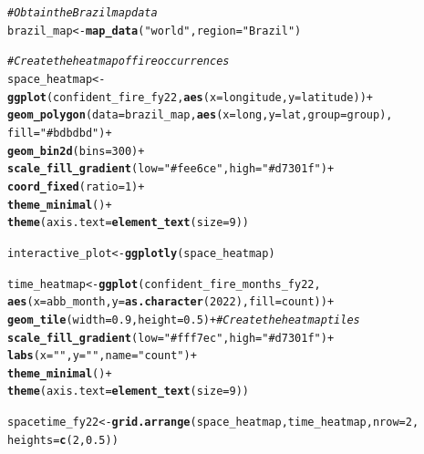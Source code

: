 \documentclass{article}\usepackage[]{graphicx}\usepackage[]{xcolor}
\makeatletter
\newcommand{\hlnum}[1]{\textcolor[rgb]{0.686,0.059,0.569}{#1}}%
\newcommand{\hlstr}[1]{\textcolor[rgb]{0.192,0.494,0.8}{#1}}%
\newcommand{\hlcom}[1]{\textcolor[rgb]{0.678,0.584,0.686}{\textit{#1}}}%
\newcommand{\hlopt}[1]{\textcolor[rgb]{0,0,0}{#1}}%
\newcommand{\hlstd}[1]{\textcolor[rgb]{0.345,0.345,0.345}{#1}}%
\newcommand{\hlkwb}[1]{\textcolor[rgb]{0.69,0.353,0.396}{#1}}%
\newcommand{\hlkwc}[1]{\textcolor[rgb]{0.333,0.667,0.333}{#1}}%
\newcommand{\hlkwd}[1]{\textcolor[rgb]{0.737,0.353,0.396}{\textbf{#1}}}%
\newenvironment{kframe}{%
 \def\at@end@of@kframe{}%
 \ifinner\ifhmode%
  \def\at@end@of@kframe{\end{minipage}}%
  \begin{minipage}{\columnwidth}%
 \fi\fi%
 \def\FrameCommand##1{\hskip\@totalleftmargin \hskip-\fboxsep
 \colorbox{shadecolor}{##1}\hskip-\fboxsep
     \hskip-\linewidth \hskip-\@totalleftmargin \hskip\columnwidth}%
 \MakeFramed {\advance\hsize-\width
   \@totalleftmargin\z@ \linewidth\hsize
   \@setminipage}}%
 {\par\unskip\endMakeFramed%
 \at@end@of@kframe}
\newenvironment{knitrout}{}{} %
\makeatother
\begin{document}
\begin{knitrout}\scriptsize
{}\color{fgcolor}\begin{kframe}
\begin{alltt}
\hlcom{# Obtain the Brazil map data}
\hlstd{brazil_map} \hlkwb{<-} \hlkwd{map_data}\hlstd{(}\hlstr{"world"}\hlstd{,} \hlkwc{region} \hlstd{=} \hlstr{"Brazil"}\hlstd{)}

\hlcom{# Create the heatmap of fire occurrences}
\hlstd{space_heatmap} \hlkwb{<-} \hlkwd{ggplot}\hlstd{(confident_fire_fy22,} \hlkwd{aes}\hlstd{(}\hlkwc{x} \hlstd{= longitude,} \hlkwc{y} \hlstd{= latitude))} \hlopt{+}
  \hlkwd{geom_polygon}\hlstd{(}\hlkwc{data} \hlstd{= brazil_map,} \hlkwd{aes}\hlstd{(}\hlkwc{x} \hlstd{= long,} \hlkwc{y} \hlstd{= lat,} \hlkwc{group} \hlstd{= group),}
               \hlkwc{fill} \hlstd{=} \hlstr{"#bdbdbd"}\hlstd{)} \hlopt{+}
  \hlkwd{geom_bin2d}\hlstd{(}\hlkwc{bins} \hlstd{=} \hlnum{300}\hlstd{)} \hlopt{+}
  \hlkwd{scale_fill_gradient}\hlstd{(}\hlkwc{low} \hlstd{=} \hlstr{"#fee6ce"}\hlstd{,} \hlkwc{high} \hlstd{=} \hlstr{"#d7301f"}\hlstd{)} \hlopt{+}
  \hlkwd{coord_fixed}\hlstd{(}\hlkwc{ratio} \hlstd{=} \hlnum{1}\hlstd{)} \hlopt{+}
  \hlkwd{theme_minimal}\hlstd{()}\hlopt{+}
  \hlkwd{theme}\hlstd{(}\hlkwc{axis.text} \hlstd{=} \hlkwd{element_text}\hlstd{(}\hlkwc{size} \hlstd{=} \hlnum{9}\hlstd{))}

\hlstd{interactive_plot} \hlkwb{<-} \hlkwd{ggplotly}\hlstd{(space_heatmap)}

\hlstd{time_heatmap} \hlkwb{<-} \hlkwd{ggplot}\hlstd{(confident_fire_months_fy22,}
                       \hlkwd{aes}\hlstd{(}\hlkwc{x} \hlstd{= abb_month,} \hlkwc{y} \hlstd{=} \hlkwd{as.character}\hlstd{(}\hlnum{2022}\hlstd{),} \hlkwc{fill} \hlstd{= count))} \hlopt{+}
  \hlkwd{geom_tile}\hlstd{(}\hlkwc{width} \hlstd{=} \hlnum{0.9}\hlstd{,} \hlkwc{height} \hlstd{=} \hlnum{0.5}\hlstd{)} \hlopt{+}  \hlcom{# Create the heatmap tiles}
  \hlkwd{scale_fill_gradient}\hlstd{(}\hlkwc{low} \hlstd{=} \hlstr{"#fff7ec"}\hlstd{,} \hlkwc{high} \hlstd{=} \hlstr{"#d7301f"}\hlstd{)} \hlopt{+}
  \hlkwd{labs}\hlstd{(}\hlkwc{x} \hlstd{=} \hlstr{" "}\hlstd{,} \hlkwc{y} \hlstd{=} \hlstr{" "}\hlstd{,} \hlkwc{name} \hlstd{=} \hlstr{"count"}\hlstd{)} \hlopt{+}
  \hlkwd{theme_minimal}\hlstd{()} \hlopt{+}
  \hlkwd{theme}\hlstd{(}\hlkwc{axis.text} \hlstd{=} \hlkwd{element_text}\hlstd{(}\hlkwc{size} \hlstd{=} \hlnum{9}\hlstd{))}

\hlstd{spacetime_fy22} \hlkwb{<-} \hlkwd{grid.arrange}\hlstd{(space_heatmap, time_heatmap,} \hlkwc{nrow} \hlstd{=} \hlnum{2}\hlstd{,}
                               \hlkwc{heights} \hlstd{=} \hlkwd{c}\hlstd{(}\hlnum{2}\hlstd{,}\hlnum{0.5}\hlstd{))}


\end{alltt}
\end{kframe}
\end{knitrout}
\end{document}
